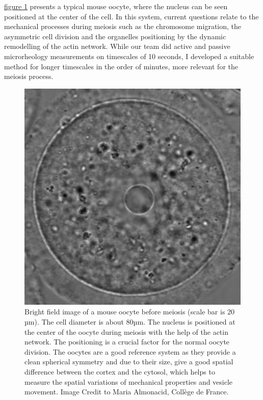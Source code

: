 \documentclass[A4paperpaper,11pt,english]{sphinxmanual}
\begin{document}
\hyperref[index-latex:oocytewt]{figure  \ref*{index-latex:oocytewt}} presents a typical mouse
oocyte, where the nucleus can be seen positioned at the center of the cell.
In this system, current questions relate to the mechanical processes during meiosis such as the chromosome migration,
the asymmetric cell division and the organelles positioning by the dynamic remodelling of the actin network.
While our team did active and passive microrheology measurements on timescales of 10 seconds, I developed a
suitable method  for longer timescales in the order of minutes, more relevant for the meiosis process.
\begin{figure}[htbp]
\centering
\capstart

\includegraphics[width=0.600\linewidth]{oocyte-wild-type.png}
\caption{Bright field image of a mouse oocyte before meiosis (scale bar is 20 µm).
The cell diameter is about 80µm. The nucleus is positioned at the center of
the oocyte during meiosis with the help of the actin network. The
positioning is a crucial factor for the normal oocyte division. The
oocytes are a good reference system as they provide a clean spherical
symmetry and due to their size, give a good spatial difference between the
cortex and the cytosol, which helps to measure the spatial variations of
mechanical properties and vesicle movement. Image Credit to Maria
Almonacid, Collège de France.}\label{index-latex:oocytewt}\end{figure}
\end{document}
